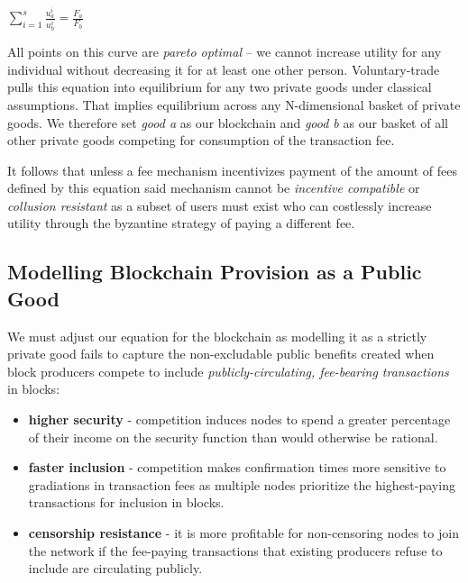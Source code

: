 \documentclass[oneside]{article}   	%
\begin{document}
\LARGE
\begin{adjustwidth}{1.5em}{1.5em} 
\begin{math}
\sum_{i=1}^{s} \frac{u_a^i}{u_b^i} = \frac{F_a}{F_b}
\end{math}
\end{adjustwidth}
\normalsize

All points on this curve are \textit{pareto optimal} -- we cannot increase utility for any individual without decreasing it for at least one other person. Voluntary-trade pulls this equation into equilibrium for any two private goods under classical assumptions. That implies equilibrium across any N-dimensional basket of private goods. We therefore set \textit{good a} as our blockchain and \textit{good b} as our basket of all other private goods competing for consumption of the transaction fee.

It follows that unless a fee mechanism incentivizes payment of the amount of fees defined by this equation said mechanism cannot be \textit{incentive compatible} or \textit{collusion resistant} as a subset of users must exist who can costlessly increase utility through the byzantine strategy of paying a different fee.

\subsection*{Modelling Blockchain Provision as a Public Good}

We must adjust our equation for the blockchain as modelling it as a strictly private good fails to capture the non-excludable public benefits created when block producers compete to include \textit{publicly-circulating, fee-bearing transactions} in blocks:

\begin{itemize}
  \item \textbf{higher security} - competition induces nodes to spend a greater percentage of their income on the security function than would otherwise be rational.
  \item \textbf{faster inclusion} - competition makes confirmation times more sensitive to gradiations in transaction fees as multiple nodes prioritize the highest-paying transactions for inclusion in blocks.
  \item \textbf{censorship resistance} - it is more profitable for non-censoring nodes to join the network if the fee-paying transactions that existing producers refuse to include are circulating publicly.
\end{itemize}
\end{document}
